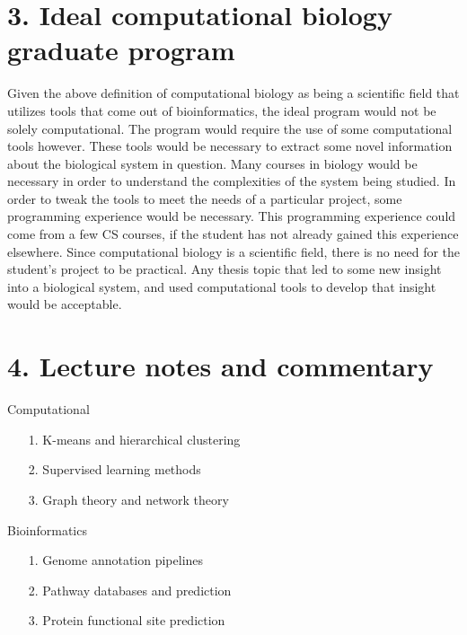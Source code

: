 \documentclass[11pt]{article}
\begin{document}
\section*{3. Ideal computational biology graduate program}

Given the above definition of computational biology as being a scientific field that
utilizes tools that come out of bioinformatics, the ideal program would not be solely
computational. The program would require the use of some computational tools however.
These tools would be necessary to extract some novel information about the 
biological system in question. Many courses in biology would be necessary in 
order to understand the complexities of the system being studied. 
In order to tweak the tools to meet the needs of a particular
project, some programming experience would be necessary. This programming experience
could come from a few CS courses, if the student has not already gained this experience elsewhere.
Since computational biology is a scientific field, there is no need for the student's project
to be practical. Any thesis topic that led to some new insight into a biological system,
and used computational tools to develop that insight would be acceptable. 


\section*{4. Lecture notes and commentary}

Computational
\begin{itemize}
\item[1.] K-means and hierarchical clustering
\item[2.] Supervised learning methods
\item[3.] Graph theory and network theory
\end{itemize}

Bioinformatics
\begin{itemize}
\item[1.] Genome annotation pipelines
\item[2.] Pathway databases and prediction
\item[3.] Protein functional site prediction
\end{itemize}
\end{document}
